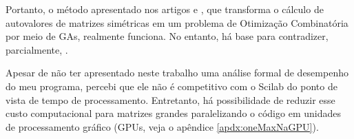 	Portanto, o método apresentado nos artigos \cite{metodo2004} e \cite{metodo2011}, que transforma o cálculo de autovalores de matrizes simétricas em um problema de Otimização Combinatória por meio de GAs, realmente funciona. No entanto, há base para contradizer, parcialmente, \cite{metodo2004}.
	
	Apesar de não ter apresentado neste trabalho uma análise formal de desempenho do meu programa, percebi que ele não é competitivo com o Scilab do ponto de vista de tempo de processamento. Entretanto, há possibilidade de reduzir esse custo computacional para matrizes grandes paralelizando o código em unidades de processamento gráfico (GPUs, veja o apêndice \ref{apdx:oneMaxNaGPU}).